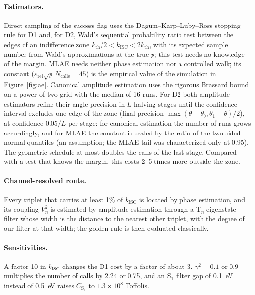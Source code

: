 \documentclass[journal=jctcce,manuscript=article]{achemso}
\newcommand{\kisc}{k_\mathrm{ISC}}
\begin{document}
\paragraph{Estimators.} Direct sampling of the success flag uses the Dagum--Karp--Luby--Ross stopping rule for
D1 and, for D2, Wald's sequential probability ratio test between the edges of an indifference zone
$k_\mathrm{th}/2<\kisc<2k_\mathrm{th}$, with its expected sample number from Wald's approximations at the true
$p$; this test needs no knowledge of the margin. MLAE needs neither phase estimation nor a controlled
walk; its constant ($\varepsilon_\mathrm{rel}\sqrt p\,N_\mathrm{calls}=45$) is the empirical value of the
simulation in Figure~\ref{fig:ae}. Canonical amplitude estimation uses the rigorous Brassard bound on a
power-of-two grid with the median of 16 runs. For D2 both amplitude estimators refine their angle precision in
$L$ halving stages until the confidence interval excludes one edge of the zone (final precision
$\max(\theta-\theta_0,\theta_1-\theta)/2$), at confidence $0.05/L$ per stage: for canonical estimation the
number of runs grows accordingly, and for MLAE the constant is scaled by the ratio of the two-sided normal
quantiles (an assumption; the MLAE tail was characterized only at 0.95). The geometric schedule at most doubles
the calls of the last stage. Compared with a test that knows the margin, this costs 2--5 times more outside the
zone.

\paragraph{Channel-resolved route.} Every triplet that carries at least 1\% of $\kisc$ is located by phase
estimation, and its coupling $V_n^2$ is estimated by amplitude estimation through a T$_n$ eigenstate filter
whose width is the distance to the nearest other triplet, with the degree of our filter at that width; the golden rule is then evaluated classically.

\paragraph{Sensitivities.} A factor 10 in $\kisc$ changes the D1 cost by a factor of about 3. $\gamma^2=0.1$ or
0.9 multiplies the number of calls by 2.24 or 0.75, and an S$_1$ filter gap of 0.1~eV instead of 0.5~eV raises
$C_{\mathrm{S}_1}$ to $1.3\times10^{8}$ Toffolis.
\end{document}
